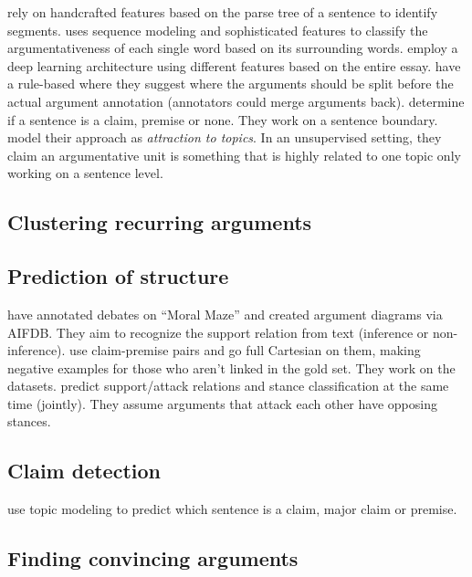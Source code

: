 \documentclass[a4paper,10pt]{article}
\begin{document}
\cite{persing2016end} rely on handcrafted features based on the parse tree
of a sentence to identify segments. 
\cite{stab2017argumentative} uses sequence modeling and sophisticated
features to classify the argumentativeness of each single word based on
its surrounding words. 
\cite{eger2017neural} employ a deep learning architecture using different
features based on the entire essay.
\cite{al2016news} have a rule-based where they suggest where the arguments
should be split before the actual argument annotation (annotators could
merge arguments back).
\cite{Aker2017} determine if a sentence is a claim,
premise or none. They work on a sentence boundary. 
\cite{Ferrara2017} model their approach as \emph{attraction to topics}. 
In an unsupervised setting, they claim an argumentative unit 
is something that is highly related to one topic only working on a 
sentence level. 

\subsection{Clustering recurring arguments}

\subsection{Prediction of structure}

\cite{Lawrence2017} have annotated debates on ``Moral Maze'' and created
argument diagrams via AIFDB\@. They aim to recognize the support relation
from text (inference or non-inference).
\cite{Aker2017} use claim-premise pairs and go full Cartesian on them,
making negative examples for those who aren't linked in the gold set. They
work on the~\cite{stab2017parsing, aharoni2014benchmark} datasets.
\cite{Hou2017} predict support/attack relations and stance classification at the same
time (jointly). They assume arguments that attack each other 
have opposing stances. 

\subsection{Claim detection}

\cite{Ferrara2017} use topic modeling to predict which sentence is a 
claim, major claim or premise. 

\subsection{Finding convincing arguments}
\end{document}
